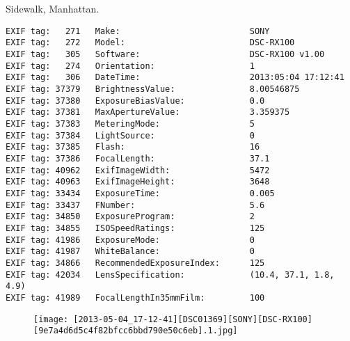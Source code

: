 \section{\protect{}}
\noindent Sidewalk, Manhattan.
\noindent
\begin{lstlisting}
EXIF tag:   271   Make:                          SONY
EXIF tag:   272   Model:                         DSC-RX100
EXIF tag:   305   Software:                      DSC-RX100 v1.00
EXIF tag:   274   Orientation:                   1
EXIF tag:   306   DateTime:                      2013:05:04 17:12:41
EXIF tag: 37379   BrightnessValue:               8.00546875
EXIF tag: 37380   ExposureBiasValue:             0.0
EXIF tag: 37381   MaxApertureValue:              3.359375
EXIF tag: 37383   MeteringMode:                  5
EXIF tag: 37384   LightSource:                   0
EXIF tag: 37385   Flash:                         16
EXIF tag: 37386   FocalLength:                   37.1
EXIF tag: 40962   ExifImageWidth:                5472
EXIF tag: 40963   ExifImageHeight:               3648
EXIF tag: 33434   ExposureTime:                  0.005
EXIF tag: 33437   FNumber:                       5.6
EXIF tag: 34850   ExposureProgram:               2
EXIF tag: 34855   ISOSpeedRatings:               125
EXIF tag: 41986   ExposureMode:                  0
EXIF tag: 41987   WhiteBalance:                  0
EXIF tag: 34866   RecommendedExposureIndex:      125
EXIF tag: 42034   LensSpecification:             (10.4, 37.1, 1.8, 4.9)
EXIF tag: 41989   FocalLengthIn35mmFilm:         100

\end{lstlisting}
\clearpage
\begin{figure}
\raggedleft
\texttt{[image: [2013-05-04\_17-12-41][DSC01369][SONY][DSC-RX100][9e7a4d6d5c4f82bfcc6bbd790e50c6eb].1.jpg]}
\end{figure}


\clearpage
